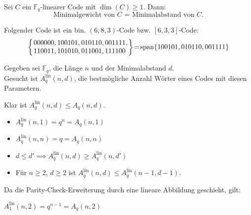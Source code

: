 \documentclass{cheat-sheet}
\newcommand{\F}{\mathbb{F}} %
\DeclareMathOperator{\spann}{span} %
\newcommand{\lin}{\text{lin}} %
\begin{document}
\begin{lem}
  Sei $C$ ein $\F_q$-linearer Code mit $\dim(C) \geq 1$.
  Dann:
  \[ \text{Minimalgewicht von $C$ = Minimalabstand von $C$.} \]
\end{lem}

\begin{bsp}
  Folgender Code ist ein bin. $(6, 8, 3)$-Code bzw. $[6, 3, 3]$-Code:
  \[
    \arraycolsep=1pt
    \left\{ \begin{array}{rl}
      000000,
      100101,
      & 010110,
      001111, \\
      110011,
      101010,
      & 011001,
      111100
    \end{array} \right\} \!=\! \spann \{ 100101, 010110, 001111 \}
  \]
\end{bsp}



\begin{prob}
  Gegeben sei $\F_q$, die Länge $n$ und der Minimalabstand $d$. \\
  Gesucht ist $A_q^\lin(n, d)$, die bestmögliche Anzahl Wörter eines Codes mit diesen Parametern.
\end{prob}

\begin{bem}
  Klar ist $A_q^\lin(n, d) \leq A_q(n, d)$.
\end{bem}

\begin{lem}
  \begin{itemize}
    \item $A_q^\lin(n, 1) = q^n = A_q(n, 1)$
    \item $A_q^\lin(n, n) = q = A_q(n, n)$
    \item $d \leq d' \implies A_q^\lin(n, d) \geq A_q^\lin(n, d')$
    \item Für $n \geq 2$, $d \geq 2$ ist $A_q^\lin(n, d) \leq A_q^\lin(n-1, d-1)$.
  \end{itemize}
\end{lem}

\begin{bem}
  Da die Parity-Check-Erweiterung durch eine lineare Abbildung geschieht, gilt:
\end{bem}

\begin{satz}
  $A_1^\lin(n, 2) = q^{n-1} = A_q(n,2)$
\end{satz}
\end{document}
